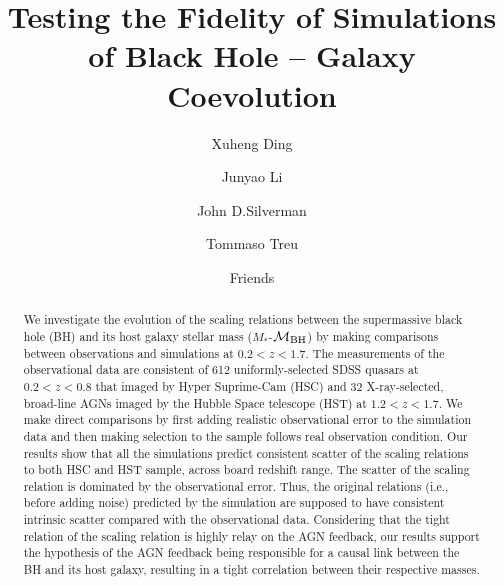 \documentclass[twocolumn]{aastex631}
\newcommand{\todo}[1]{\textcolor{red}{[{\bf TODO}: #1]}}
\def\smass{{$M_*$}}
\def\mbh{$\mathcal M_{\rm BH}$}
\begin{document}
\title{Testing the Fidelity of Simulations of Black Hole -- Galaxy Coevolution}

\author[0000-0001-8917-2148]{Xuheng Ding}

\author[0000-0002-1605-915X]{Junyao Li}

\author[0000-0002-0000-6977]{John D.Silverman}


\author[0000-0002-8460-0390]{Tommaso Treu}

\author{Friends}

\begin{abstract}
We investigate the evolution of the scaling relations between the supermassive black hole (BH) and its host galaxy stellar mass (\smass-\mbh) by making comparisons between observations and simulations at $0.2<z<1.7$. The measurements of the observational data are consistent of 612 uniformly-selected SDSS quasars at $0.2 < z < 0.8$ that imaged by Hyper Suprime-Cam (HSC) and 32 X-ray-selected, broad-line AGNs imaged by the Hubble Space telescope (HST) at $1.2<z<1.7$. We make direct comparisons by first adding realistic observational error to the simulation data and then making selection to the sample follows real observation condition. Our results show that all the simulations predict consistent scatter of the scaling relations to both HSC and HST sample, across board redshift range. %
The scatter of the scaling relation is dominated by the observational error. Thus, the original relations (i.e., before adding noise) predicted by the simulation are supposed to have consistent intrinsic scatter compared with the observational data. Considering that the tight relation of the scaling relation is highly relay on the AGN feedback, our results support the hypothesis of the AGN feedback being responsible for a causal link between the BH and its host galaxy, resulting in a tight correlation between their respective masses.
\end{abstract}
\end{document}
